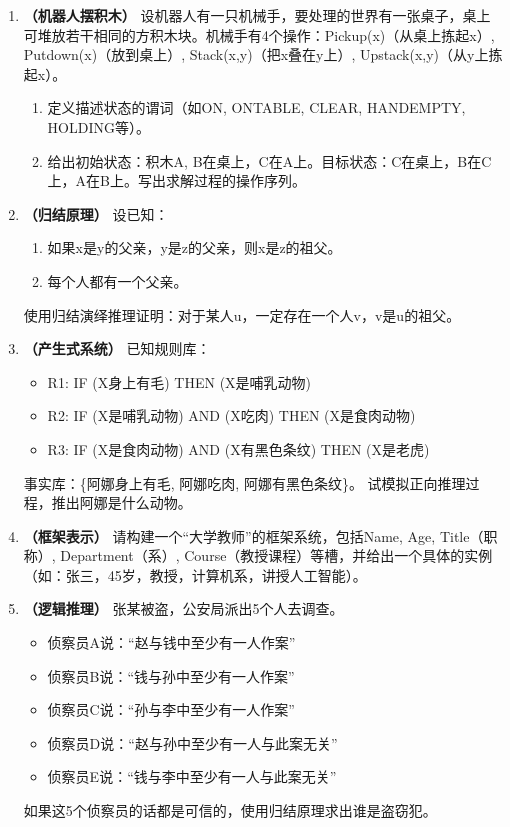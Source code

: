\begin{enumerate}[leftmargin=2em,itemsep=1em]

\item \textbf{（机器人摆积木）} 设机器人有一只机械手，要处理的世界有一张桌子，桌上可堆放若干相同的方积木块。机械手有4个操作：Pickup(x)（从桌上拣起x）, Putdown(x)（放到桌上）, Stack(x,y)（把x叠在y上）, Upstack(x,y)（从y上拣起x）。
\begin{enumerate}
    \item 定义描述状态的谓词（如ON, ONTABLE, CLEAR, HANDEMPTY, HOLDING等）。
    \item 给出初始状态：积木A, B在桌上，C在A上。目标状态：C在桌上，B在C上，A在B上。写出求解过程的操作序列。
\end{enumerate}

\item \textbf{（归结原理）} 设已知：
\begin{enumerate}
    \item 如果x是y的父亲，y是z的父亲，则x是z的祖父。
    \item 每个人都有一个父亲。
\end{enumerate}
使用归结演绎推理证明：对于某人u，一定存在一个人v，v是u的祖父。

\item \textbf{（产生式系统）} 已知规则库：
\begin{itemize}
    \item R1: IF (X身上有毛) THEN (X是哺乳动物)
    \item R2: IF (X是哺乳动物) AND (X吃肉) THEN (X是食肉动物)
    \item R3: IF (X是食肉动物) AND (X有黑色条纹) THEN (X是老虎)
\end{itemize}
事实库：\{阿娜身上有毛, 阿娜吃肉, 阿娜有黑色条纹\}。
试模拟正向推理过程，推出阿娜是什么动物。

\item \textbf{（框架表示）} 请构建一个“大学教师”的框架系统，包括Name, Age, Title（职称）, Department（系）, Course（教授课程）等槽，并给出一个具体的实例（如：张三，45岁，教授，计算机系，讲授人工智能）。

\item \textbf{（逻辑推理）} 张某被盗，公安局派出5个人去调查。
\begin{itemize}
    \item 侦察员A说：“赵与钱中至少有一人作案”
    \item 侦察员B说：“钱与孙中至少有一人作案”
    \item 侦察员C说：“孙与李中至少有一人作案”
    \item 侦察员D说：“赵与孙中至少有一人与此案无关”
    \item 侦察员E说：“钱与李中至少有一人与此案无关”
\end{itemize}
如果这5个侦察员的话都是可信的，使用归结原理求出谁是盗窃犯。


\end{enumerate}
